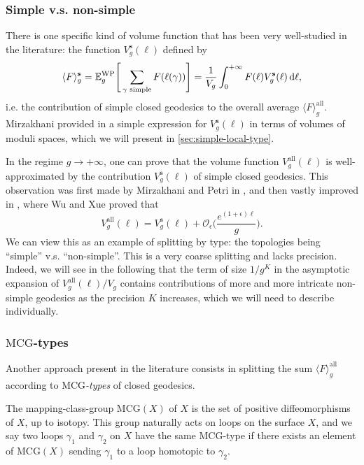 \documentclass[12pt,twoside]{article}
\theoremstyle{theorem}
\theoremstyle{remark}
\theoremstyle{definition}
\theoremstyle{example}
\renewcommand{\d}{\, \mathrm{d}}
\newcommand{\1}[1]{\mathds{1}_{#1}}
\newcommand{\MCG}{\mathrm{MCG}}
\newcommand{\Ewp}[2][g]{\mathbb{E}_{#1}^{\mathrm{\scriptsize{WP}}} \Bigg[ #2 \Bigg]}
\newcommand{\av}[2][\mathrm{all}]{\langle #2 \rangle_g^{{#1}}}
\begin{document}
\subsubsection{Simple v.s. non-simple}
\label{sec:simple_vs}

There is one specific kind of volume function that has been very well-studied in the literature: the
function $V_g^{\mathbf{s}}(\ell)$ defined by
\begin{equation}
  \label{eq:av_S}
  \av[\mathbf{s}]{F}
  = \Ewp{\sum_{\gamma \text{ simple}}F(\ell(\gamma))}
  = \frac{1}{V_g} \int_0^{+ \infty} F(\ell) V_g^{\mathbf{s}}(\ell) \d \ell,
\end{equation}
i.e. the contribution of simple closed geodesics to the overall average $\av{F}$. Mirzakhani
provided in \cite{mirzakhani2007} a simple expression for $V_g^{\mathbf{s}}(\ell)$ in terms of
volumes of moduli spaces, which we will present in \cref{sec:simple-local-type}.

In the regime $g \rightarrow + \infty$, one can prove that the volume function
$V_g^{\mathrm{all}}(\ell)$ is well-approximated by the contribution $V_g^{\mathbf{s}}(\ell)$ of
simple closed geodesics. This observation was first made by Mirzakhani and Petri in
\cite{mirzakhani2019}, and then vastly improved in \cite{wu2022}, where Wu and Xue proved that
\begin{equation}
  \label{eq:approx_s}
  V_g^{\mathrm{all}}(\ell)
  = V_g^{\mathbf{s}}(\ell) 
  + \mathcal{O}_\epsilon \Bigg(\frac{e^{(1+\epsilon) \ell}}{g} \Bigg).
\end{equation}
We can view this as an example of splitting by type: the topologies being ``simple''
v.s. ``non-simple''.
This is a very coarse splitting and lacks precision. Indeed, we will see in the following that the
term of size $1/g^K$ in the asymptotic expansion of $V_g^{\mathrm{all}}(\ell)/V_g$ contains
contributions of more and more intricate non-simple geodesics as the precision $K$ increases, which
we will need to  describe individually.


\subsubsection{$\MCG$-types}

Another approach present in the literature consists in splitting the sum $\av{F}$ according to
\emph{$\MCG$-types} of closed geodesics.

The mapping-class-group $\MCG(X)$ of $X$ is the set of positive diffeomorphisms of
$X$, up to isotopy. This group naturally acts on loops on the surface $X$, and we say two loops
$\gamma_1$ and $\gamma_2$ on $X$ have the same $\MCG$-type if there exists an element of $\MCG(X)$
sending $\gamma_1$ to a loop homotopic to $\gamma_2$.
\end{document}
